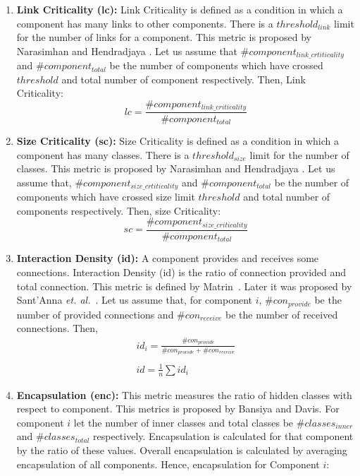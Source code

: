 \documentclass[letterpaper, 10 pt, conference]{ieeeconf}  %
\begin{document}
\begin{enumerate}
\item \textbf{Link Criticality (lc):} Link Criticality is defined as a condition in which a component has many links to other components. There is a $threshold_{link}$ limit for the number of links for a component. This metric is proposed by Narasimhan and Hendradjaya  \cite{narasimhan2007some}. Let us assume that $\#component_{link\_crtiticality}$ and $\#component_{total}$ be  the number of components which have crossed $threshold$ and total number of component respectively. Then, Link Criticality:
\begin{equation}\label{lc_eq}
lc=\frac{\#component_{link\_criticality}}{\#component_{total}\textbf{}}
\end{equation}

\item \textbf{Size Criticality (sc):} Size Criticality is defined as a condition in which a component has many classes. There is a $threshold_{size}$ limit for the number of classes. This metric is proposed by Narasimhan and Hendradjaya  \cite{narasimhan2007some}. Let us assume that, $\#component_{size\_crtiticality}$ and $\#component_{total}$ be the  number of components which have crossed size limit $threshold$ and total number of components respectively. Then, size Criticality:
\begin{equation}\label{sc_eq}
sc=\frac{\#component_{size\_criticality}}{\#component_{total}}
\end{equation}

\item \textbf{Interaction Density (id):} A component provides and receives some connections. Interaction Density (id) is the ratio of connection provided and total connection. This metric is defined by Matrin~\cite{martin1994oo}. Later it was proposed by Sant'Anna \textit{et. al.}~\cite{sant2007modularity}. Let us assume that, for component $i$,
$\#con_{provide}$ be the number of provided connections and $\#con_{receive}$ be the number of received connections. Then,
\begin{equation}\label{id_eq}
 \begin{array}{l}
id_{i}=\frac{\#con_{provide}}{\#con_{provide}+\#con_{receive}} \\\\
id=\frac{1}{n}\sum{id_{i}}
\end{array}
\end{equation}


\item \textbf{Encapsulation (enc):} This metric measures the ratio of hidden classes with respect to component. This metrics is proposed by Bansiya and Davis\cite{bansiya2002hierarchical}. For component $i$ let the number of inner classes and total classes be $\#classes_{inner}$ and $\#classes_{total}$ respectively. Encapsulation is calculated for that component by the ratio of these values. Overall encapsulation is calculated by averaging encapsulation of all components. Hence, encapsulation for Component $i$:


\end{enumerate}
\end{document}
